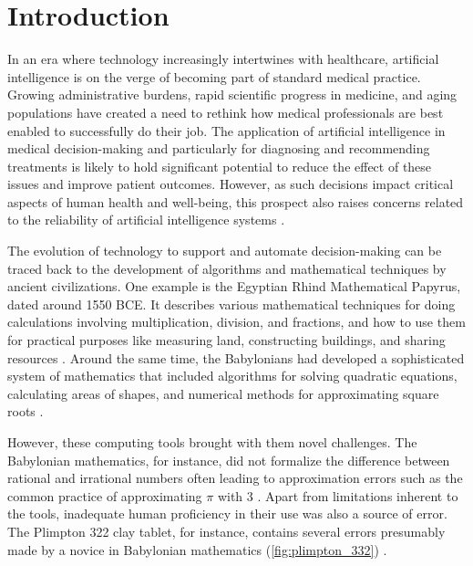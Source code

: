 
\chapter[introduction]{Introduction}\label{chp:introduction}
%
%

In an era where technology increasingly intertwines with healthcare, artificial intelligence is on the verge of becoming part of standard medical practice. 
Growing administrative burdens, rapid scientific progress in medicine, and aging populations have created a need to rethink how medical professionals are best enabled to successfully do their job. 
The application of artificial intelligence in medical decision-making and particularly for diagnosing and recommending treatments is likely to hold significant potential to reduce the effect of these issues and improve patient outcomes. 
However, as such decisions impact critical aspects of human health and well-being, this prospect also raises concerns related to the reliability of artificial intelligence systems \cite{chen_ethical_2021, shailaja_machine_2018, ahmad_interpretable_2018}.

The evolution of technology to support and automate decision-making can be traced back to the development of algorithms and mathematical techniques by ancient civilizations. 
One example is the Egyptian Rhind Mathematical Papyrus, dated around 1550 BCE. It describes various mathematical techniques for doing calculations involving multiplication, division, and fractions, and how to use them for practical purposes like measuring land, constructing buildings, and sharing resources \cite{georges_universal_2001}. 
Around the same time, the Babylonians had developed a sophisticated system of mathematics that included algorithms for solving quadratic equations, calculating areas of shapes, and numerical methods for approximating square roots \cite{fowler_square_1998}. 

However, these computing tools brought with them novel challenges. The Babylonian mathematics, for instance, did not formalize the difference between rational and irrational numbers often leading to approximation errors such as the common practice of approximating $\pi$ with 3 \cite{georges_universal_2001}. Apart from limitations inherent to the tools, inadequate human proficiency in their use was also a source of error. The Plimpton 322 clay tablet, for instance, contains several errors presumably made by a novice in Babylonian mathematics (\cref{fig:plimpton_332}) \cite{britton_plimpton_2011}. 

